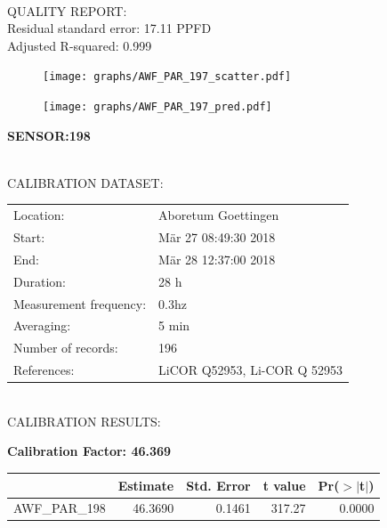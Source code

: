 \documentclass[oneside]{report}
\begin{document}
\hrulefill\\
QUALITY REPORT:\\
Residual standard error: 17.11 PPFD\\
Adjusted R-squared: 0.999



\begin{figure}[H]
  \centering
  \texttt{[image: graphs/AWF\_PAR\_197\_scatter.pdf]}
\end{figure}




\begin{figure}[H]
  \centering
  \texttt{[image: graphs/AWF\_PAR\_197\_pred.pdf]}
\end{figure}

\pagebreak


\begin{center}
\large{\textbf{SENSOR:198}}\\
\end{center}

\hrulefill\\
CALIBRATION DATASET:\\
\begin{table}[h!]
  \centering
  \label{tab:table1}
  \begin{tabular}{ll}
    Location: & Aboretum Goettingen\\ 
    
    
    Start:  & Mär 27 08:49:30 2018 \\
    End:   & Mär 28 12:37:00 2018\\ 
    Duration: & 28 h\\
    Measurement frequency: & 0.3hz\\
    Averaging:  &5 min\\
    Number of records: & 196 \\
    References: & LiCOR Q52953, Li-COR Q 52953 \\
  \end{tabular}
\end{table}

\hrulefill\\
CALIBRATION RESULTS:\\


\begin{center}
\textbf{\large{Calibration Factor: 46.369}}\\
\end{center}
\begin{table}[ht]
\centering
\begin{tabular}{rrrrr}
  \hline
 & Estimate & Std. Error & t value & Pr($>$$|$t$|$) \\ 
  \hline
AWF\_PAR\_198 & 46.3690 & 0.1461 & 317.27 & 0.0000 \\ 
   \hline
\end{tabular}
\end{table}
\end{document}

